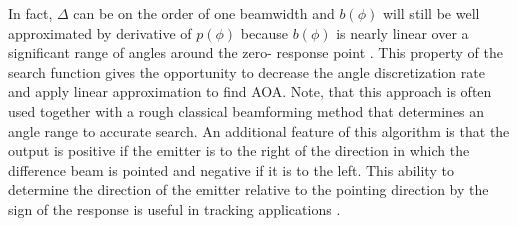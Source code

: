 In fact, $\Delta$ can be on the order of one beamwidth and $b(\phi)$ will still
be well approximated by derivative of $p(\phi)$ because $b(\phi)$ is nearly
linear over a significant range of angles around the zero- response point
\cite{Tuncer2009}.
This property of the search function gives the opportunity to decrease the
angle discretization rate and apply linear approximation to find AOA. Note,
that this approach is often used together with a rough classical beamforming
method that determines an angle range to accurate search.  An additional
feature of this algorithm is that the output is positive if the emitter is to
the right of the direction in which the difference beam is pointed and negative
if it is to the left. This ability to determine the direction of the emitter
relative to the pointing direction by the sign of the response is useful in
tracking applications \cite{Tuncer2009}.

